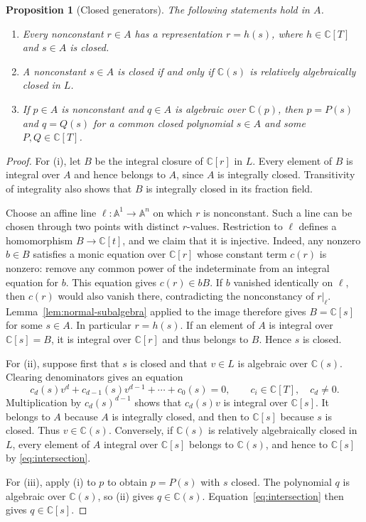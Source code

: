 \documentclass[11pt,reqno]{amsart}
\numberwithin{equation}{section}
\theoremstyle{plain}
\newtheorem{proposition}[theorem]{Proposition}
\theoremstyle{definition}
\theoremstyle{remark}
\newcommand{\C}{\mathbb C}
\newcommand{\A}{\mathbb A}
\begin{document}
\begin{proposition}[Closed generators]\label{prop:closed-generators}
The following statements hold in $A$.
\begin{enumerate}[label=\textup{(\roman*)}]
\item Every nonconstant $r\in A$ has a representation $r=h(s)$,
where $h\in\C[T]$ and $s\in A$ is closed.
\item A nonconstant $s\in A$ is closed if and only if $\C(s)$ is
relatively algebraically closed in $L$.
\item If $p\in A$ is nonconstant and $q\in A$ is algebraic over
$\C(p)$, then $p=P(s)$ and $q=Q(s)$ for a common closed polynomial
$s\in A$ and some $P,Q\in\C[T]$.
\end{enumerate}
\end{proposition}
\begin{proof}
For (i), let $B$ be the integral closure of $\C[r]$ in $L$.
Every element of $B$ is integral over $A$ and hence belongs to $A$,
since $A$ is integrally closed. Transitivity of integrality also
shows that $B$ is integrally closed in its fraction field.

Choose an affine line $\ell:\A^1\to\A^n$ on which $r$ is
nonconstant. Such a line can be chosen through two points with
distinct $r$-values. Restriction to $\ell$ defines a homomorphism
$B\to\C[t]$, and we claim that it is injective. Indeed, any
nonzero $b\in B$ satisfies a monic equation over $\C[r]$ whose
constant term $c(r)$ is nonzero: remove any common power of the
indeterminate from an integral equation for $b$. This equation gives
$c(r)\in bB$. If $b$ vanished identically on $\ell$, then $c(r)$ would also vanish
there, contradicting the nonconstancy of $r|_\ell$.
Lemma~\ref{lem:normal-subalgebra} applied to the image therefore
gives $B=\C[s]$ for some $s\in A$. In particular $r=h(s)$.
If an element of $A$ is integral over $\C[s]=B$, it is integral
over $\C[r]$ and thus belongs to $B$. Hence $s$ is closed.

For (ii), suppose first that $s$ is closed and that $v\in L$ is
algebraic over $\C(s)$. Clearing denominators gives an equation
\[
 c_d(s)v^d+c_{d-1}(s)v^{d-1}+\cdots+c_0(s)=0,
 \qquad c_i\in\C[T],\quad c_d\ne0.
\]
Multiplication by $c_d(s)^{d-1}$ shows that $c_d(s)v$ is integral
over $\C[s]$. It belongs to $A$ because $A$ is integrally closed,
and then to $\C[s]$ because $s$ is closed. Thus $v\in\C(s)$.
Conversely, if $\C(s)$ is relatively algebraically closed in $L$,
every element of $A$ integral over $\C[s]$ belongs to $\C(s)$,
and hence to $\C[s]$ by \eqref{eq:intersection}.

For (iii), apply (i) to $p$ to obtain $p=P(s)$ with $s$ closed.
The polynomial $q$ is algebraic over $\C(s)$, so (ii) gives
$q\in\C(s)$. Equation~\eqref{eq:intersection} then gives
$q\in\C[s]$.
\end{proof}
\end{document}
